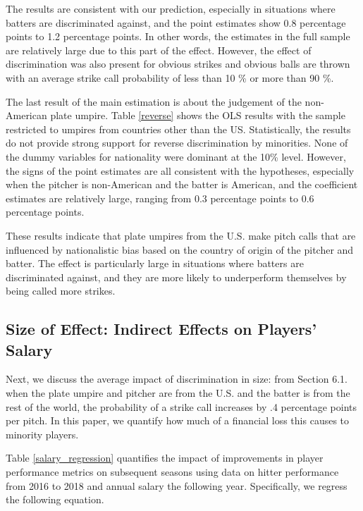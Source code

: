 \documentclass[dvipdfmx, 12pt]{jsarticle}
\begin{document}
The results are consistent with our prediction, especially in situations where batters are discriminated against, and the point estimates show 0.8 percentage points to 1.2 percentage points. In other words, the estimates in the full sample are relatively large due to this part of the effect. However, the effect of discrimination was also present for obvious strikes and obvious balls are thrown with an average strike call probability of less than 10 \% or more than 90 \%.



The last result of the main estimation is about the judgement of the non-American plate umpire. Table \ref{reverse} shows the OLS results with the sample restricted to umpires from countries other than the US. Statistically, the results do not provide strong support for reverse discrimination by minorities. None of the dummy variables for nationality were dominant at the 10\% level. However, the signs of the point estimates are all consistent with the hypotheses, especially when the pitcher is non-American and the batter is American, and the coefficient estimates are relatively large, ranging from 0.3 percentage points to 0.6 percentage points.

These results indicate that plate umpires from the U.S. make pitch calls that are influenced by nationalistic bias based on the country of origin of the pitcher and batter. The effect is particularly large in situations where batters are discriminated against, and they are more likely to underperform themselves by being called more strikes.

\subsection{Size of Effect: Indirect Effects on Players' Salary}

Next, we discuss the average impact of discrimination in size: from Section 6.1. when the plate umpire and pitcher are from the U.S. and the batter is from the rest of the world, the probability of a strike call increases by .4 percentage points per pitch. In this paper, we quantify how much of a financial loss this causes to minority players.



Table \ref{salary_regression} quantifies the impact of improvements in player performance metrics on subsequent seasons using data on hitter performance from 2016 to 2018 and annual salary the following year. Specifically, we regress the following equation.
\end{document}
